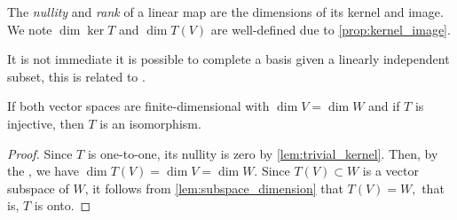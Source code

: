 \begin{remark}
    The \emph{nullity} and \emph{rank} of a linear map are the dimensions of its kernel and image. We note \(\dim \ker T\) and \(\dim T(V)\) are well-defined due to \cref{prop:kernel_image}.
\end{remark}
\begin{remark}
    It is not immediate it is possible to complete a basis given a linearly independent subset, this is related to .
\end{remark}
\begin{corollary}
    If both vector spaces are finite-dimensional with \(\dim V = \dim W\) and if \(T\) is injective, then \(T\) is an isomorphism.
\end{corollary}
\begin{proof}
    Since \(T\) is one-to-one, its nullity is zero by \cref{lem:trivial_kernel}. Then, by the , we have \(\dim T(V) = \dim V = \dim W\). Since \(T(V) \subset W\) is a vector subspace of \(W\), it follows from \cref{lem:subspace_dimension} that \(T(V) = W,\) that is, \(T\) is onto.
\end{proof}

